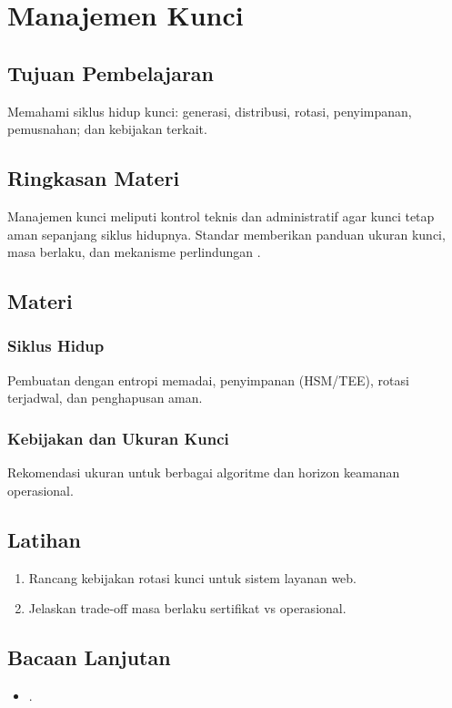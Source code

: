 \documentclass[../main.tex]{subfiles}
\begin{document}
\chapter{Manajemen Kunci}
\section{Tujuan Pembelajaran}
Memahami siklus hidup kunci: generasi, distribusi, rotasi, penyimpanan, pemusnahan; dan kebijakan terkait.

\section{Ringkasan Materi}
Manajemen kunci meliputi kontrol teknis dan administratif agar kunci tetap aman sepanjang siklus hidupnya. Standar memberikan panduan ukuran kunci, masa berlaku, dan mekanisme perlindungan \citep{sp80057pt1r5}.

\section{Materi}
\subsection{Siklus Hidup}
Pembuatan dengan entropi memadai, penyimpanan (HSM/TEE), rotasi terjadwal, dan penghapusan aman.

\subsection{Kebijakan dan Ukuran Kunci}
Rekomendasi ukuran untuk berbagai algoritme dan horizon keamanan operasional.

\section{Latihan}
\begin{enumerate}
  \item Rancang kebijakan rotasi kunci untuk sistem layanan web.
  \item Jelaskan trade-off masa berlaku sertifikat vs operasional.
\end{enumerate}

\section{Bacaan Lanjutan}
\begin{itemize}
  \item \citep{sp80057pt1r5}.
\end{itemize}
\end{document}
